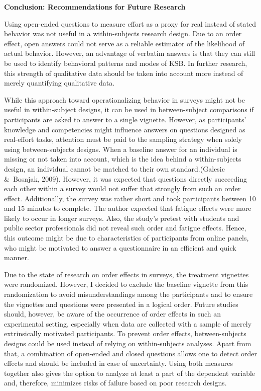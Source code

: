 \documentclass{article}
\begin{document}
\textbf{}

\textbf{Conclusion: Recommendations for Future Research}

Using open-ended questions to measure effort as a proxy for real instead of stated behavior was not useful in a within-subjects research design. Due to an order effect, open answers could not serve as a reliable estimator of the likelihood of actual behavior. However, an advantage of verbatim answers is that they can still be used to identify behavioral patterns and modes of KSB. In further research, this strength of qualitative data should be taken into account more instead of merely quantifying qualitative data.

While this approach toward operationalizing behavior in surveys might not be useful in within-subject designs, it can be used in between-subject comparisons if participants are asked to answer to a single vignette. However, as participants' knowledge and competencies might influence answers on questions designed as real-effort tasks, attention must be paid to the sampling strategy when solely using between-subjects designs. When a baseline answer for an individual is missing or not taken into account, which is the idea behind a within-subjects design, an individual cannot be matched to their own standard.(Galesic \& Bosnjak, 2009). However, it was expected that questions directly succeeding each other within a survey would not suffer that strongly from such an order effect. Additionally, the survey was rather short and took participants between 10 and 15 minutes to complete. The author expected that fatigue effects were more likely to occur in longer surveys. Also, the study's pretest with students and public sector professionals did not reveal such order and fatigue effects. Hence, this outcome might be due to characteristics of participants from online panels, who might be motivated to answer a questionnaire in an efficient and quick manner. 

Due to the state of research on order effects in surveys, the treatment vignettes were randomized. However, I decided to exclude the baseline vignette from this randomization to avoid misunderstandings among the participants and to ensure the vignettes and questions were presented in a logical order. Future studies should, however, be aware of the occurrence of order effects in such an experimental setting, especially when data are collected with a sample of merely extrinsically motivated participants. To prevent order effects, between-subjects designs could be used instead of relying on within-subjects analyses. Apart from that, a combination of open-ended and closed questions allows one to detect order effects and should be included in case of uncertainty. Using both measures together also gives the option to analyze at least a part of the dependent variable and, therefore, minimizes risks of failure based on poor research designs. 
\end{document}
